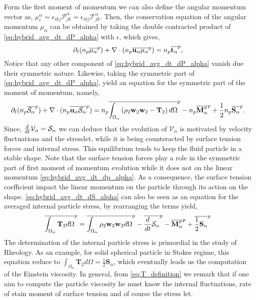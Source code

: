 Form the first moment of momentum we can also define the angular momentum vector as, $\mu^\alpha_i = \epsilon_{ikj} \mathcal{P}^\alpha_{jk} =  \epsilon_{ikj} \mathcal{T}^\alpha_{jk}$. 
Then, the conservation equation of the angular momentum $\mu_\alpha$ can be obtained by taking the double contracted product of \ref{eq:hybrid_avg_dt_dP_alpha} with $\epsilon$, which gives,
\begin{equation}
    \partial_t (n_p\overline{\mu_\alpha}^{p})
    + \mathbf{\nabla}\cdot (n_p\overline{  \textbf{u}_\alpha \mu_\alpha}^{p})
    =  
    n_p\overline{\textbf{t}_\alpha}^{p},
    \label{eq:hybrid_avg_dt_dmu_alpha}
\end{equation}
Notice that any other component of \ref{eq:hybrid_avg_dt_dP_alpha} vanish due their symmetric nature. 
Likewise, taking the symmetric part of \ref{eq:hybrid_avg_dt_dP_alpha}, yield an equation for the symmetric part of the moment of momentum, namely,
\begin{multline}    
    \partial_t (n_p\overline{\mathcal{S}_\alpha}^{p})
    + \mathbf{\nabla}\cdot (n_p\overline{  \textbf{u}_\alpha \mathcal{S}_\alpha}^{p})
    =  n_p\overline{\int_{\Omega_\alpha} \left(
        \rho_2\textbf{w}_2 \textbf{w}_2
        - \mathbf{T}_2
        \right) d\Omega}^{p}
        - n_p\overline{\textbf{M}_\alpha^\sigma}^{p}
        + \frac{1}{2}n_p\overline{\textbf{S}_\alpha}^{p}.
    \label{eq:hybrid_avg_dt_dS_alpha}
\end{multline}
Since, $\frac{d}{d t} \mathcal{V}_\alpha = \mathcal{S}_\alpha$ we can deduce that the evolution of $\mathcal{V}_\alpha$ is motivated by velocity fluctuations and the stresslet, while it is being counteracted by surface tension forces and internal stress. 
This equilibrium tends to keep the fluid particle in a stable shape. 
Note that the surface tension forces play a role in the symmetric part of first moment of momentum evolution while it does not on the linear momentum \ref{eq:hybrid_avg_dt_dp_alpha}.
As a consequence, the surface tension coefficient impact the linear momentum on the particle through its action on the shape. 
\ref{eq:hybrid_avg_dt_dS_alpha} can also be seen as an equation for the averaged internal particle stress, by rearranging the terms yield, 
\begin{equation}    
    \overline{\int_{\Omega_\alpha}\mathbf{T}_2d\Omega}^{p}
    = \overline{ \int_{\Omega_\alpha} \rho_2 \textbf{w}_2 \textbf{w}_2d\Omega}^{p}
    - \overline{ \frac{d}{d t} \mathcal{S}_\alpha}^{p}
    - \overline{ \textbf{M}_\alpha^\sigma}^{p}
    + \overline{ \frac{1}{2}\textbf{S}_\alpha}^{p}
    \label{eq:T_definition}
\end{equation}
The determination of the internal particle stress is primordial in the study of Rheology.
As an example, for solid spherical particle in Stokes regime, this equation reduce to $ \int_{\Omega_\alpha}\mathbf{T}_2d\Omega = \frac{1}{2}\textbf{S}_\alpha$, which eventually leads us the computation of the Einstein viscosity. 
In general, from \ref{eq:T_definition} we remark that if one aim to compute the particle viscosity he must know the internal fluctuations, rate of stain moment of surface tension and of course the stress let. 


